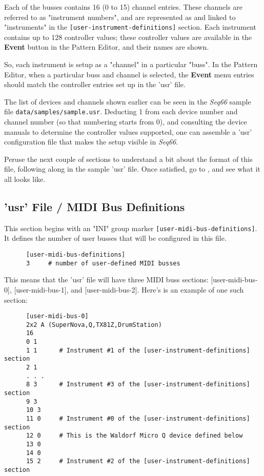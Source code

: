    Each of the busses contains 16 (0 to 15) channel entries.
   These channels are referred to as "instrument numbers", and are
   represented as and linked to "instruments" in the
   \texttt{[user-instrument-definitions]} section.  Each instrument contains up
   to 128 controller values; these controller values are available in the
   \textbf{Event} button in the Pattern Editor, and their names are shown.

   So, each instrument is setup as a "channel" in a particular "buss".
   In the Pattern Editor, when a particular buss and channel is selected,
   the \textbf{Event} menu entries should match the controller entries set up
   in the 'usr' file.

   The list of devices and channels shown earlier
   can be seen in the \textsl{Seq66} sample file
   \texttt{data/samples/sample.usr}.
   Deducting 1 from each device number and channel number (so that numbering
   starts from 0), and consulting the device manuals to determine the
   controller values supported, one can assemble a 'usr' configuration file
   that makes the setup visible in \textsl{Seq66}.

   Peruse the next couple of sections to understand a bit about the format of
   this file, following along in the sample 'usr' file.
   Once satisfied, go to
   , and 
   see what it all looks like.

\subsection{'usr' File / MIDI Bus Definitions}
\label{subsec:usr_file_midi_bus_definitions}

   This section begins with an
   "INI" group marker \texttt{[user-midi-bus-definitions]}.
   It defines the number of user busses that will be configured in this file.

   \begin{verbatim}
      [user-midi-bus-definitions]
      3     # number of user-defined MIDI busses
   \end{verbatim}

   This means that the 'usr' file will have three MIDI buss
   sections: [user-midi-bus-0], [user-midi-bus-1], and [user-midi-bus-2].
   Here's is an example of one such section:

   \begin{verbatim}
      [user-midi-bus-0]
      2x2 A (SuperNova,Q,TX81Z,DrumStation)
      16
      0 1
      1 1      # Instrument #1 of the [user-instrument-definitions] section
      2 1
      . . .
      8 3      # Instrument #3 of the [user-instrument-definitions] section
      9 3
      10 3
      11 0     # Instrument #0 of the [user-instrument-definitions] section
      12 0     # This is the Waldorf Micro Q device defined below
      13 0
      14 0
      15 2     # Instrument #2 of the [user-instrument-definitions] section
   \end{verbatim}

